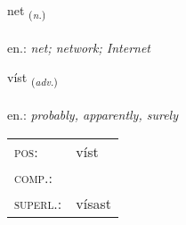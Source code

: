 \documentclass[frontgrid, backgrid]{flacards}\usepackage[]{graphicx}\usepackage[]{xcolor}
\begin{document}
\renewcommand{\flhead}{\vskip5pt \fboxsep=0pt {\small\bfseries\footnotesize Nafnorð | Noun}}
\renewcommand{\fcfoot}{\vskip5pt \fboxsep=0pt \hspace{2pt}{\small\bfseries\footnotesize 1K}}

\renewcommand{\blhead}{\vskip5pt {\small\bfseries\footnotesize Nafnorð | Noun }}
\renewcommand{\bcfoot}{\vskip5pt \hspace{2pt}{\small\bfseries\footnotesize 1K}}


{net \small{\textsubscript{(\textit{n.})}} \\[1ex] %
\textphonetic{[nɛːt]} \\
en.: \emph{net; network; Internet} \\  [2ex]
\renewcommand*{\arraystretch}{0.8}
}

\renewcommand{\flhead}{\vskip5pt \fboxsep=0pt {\small\bfseries\footnotesize Atviksorð | Adverb}}
\renewcommand{\fcfoot}{\vskip5pt \fboxsep=0pt \hspace{2pt}{\small\bfseries\footnotesize 1K}}

\renewcommand{\blhead}{\vskip5pt {\small\bfseries\footnotesize Atviksorð | Adverb }}
\renewcommand{\bcfoot}{\vskip5pt \hspace{2pt}{\small\bfseries\footnotesize 1K}}


{víst \small{\textsubscript{(\textit{adv.})}} \\[1ex] %
\textphonetic{[vist]} \\
en.: \emph{probably, apparently, surely} \\  [2ex]
\renewcommand*{\arraystretch}{0.8}
\begin{tabular}{ll}
\textsc{pos}: & víst \\ 
\textsc{comp.}: &  \\ 
\textsc{superl.}: & vísast \\
\end{tabular}
}
\end{document}
